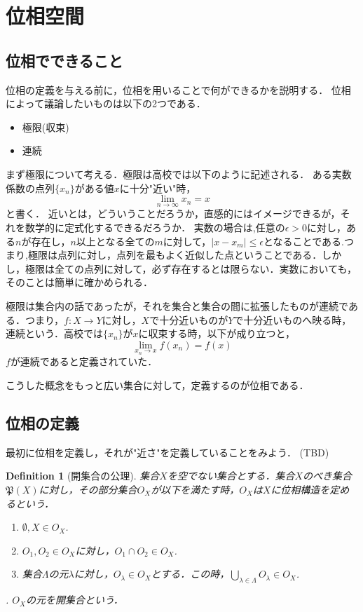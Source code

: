 \documentclass{ujarticle}
\newtheorem{dfn}[thm]{Definition}
\begin{document}
\section{位相空間}
\label{sec:位相空間}
\subsection{位相でできること}
\label{sub:位相でできること}
位相の定義を与える前に，位相を用いることで何ができるかを説明する．
位相によって議論したいものは以下の2つである．
\begin{itemize}
  \item 極限(収束)
  \item 連続
\end{itemize}

まず極限について考える．極限は高校では以下のように記述される．
ある実数係数の点列$\{ x_n \}$がある値$x$に十分"近い"時，
\begin{equation*}
 \lim_{n \to \infty} x_n=x
\end{equation*}
と書く．
近いとは，どういうことだろうか，直感的にはイメージできるが，それを数学的に定式化するできるだろうか．
実数の場合は,任意の$\epsilon \gt 0$に対し，ある$n$が存在し，$n$以上となる全ての$m$に対して，$|x - x_m| \le \epsilon$となることである.つまり,極限は点列に対し，点列を最もよく近似した点ということである．しかし，極限は全ての点列に対して，必ず存在するとは限らない．実数においても，そのことは簡単に確かめられる．

極限は集合内の話であったが，それを集合と集合の間に拡張したものが連続である．つまり，$f:X \to Y$に対し，$X$で十分近いものが$Y$で十分近いものへ映る時，連続という．高校では$\{x_n \}$が$x$に収束する時，以下が成り立つと，
\begin{equation*}
 \lim_{x_n \to x}f(x_n)=f(x)
\end{equation*}
$f$が連続であると定義されていた．

こうした概念をもっと広い集合に対して，定義するのが位相である．

\subsection{位相の定義}
\label{sub:位相の定義}
最初に位相を定義し，それが"近さ"を定義していることをみよう．
(TBD)

\begin{dfn}[開集合の公理]
 集合$X$を空でない集合とする．集合$X$のべき集合$\mathfrak{P}(X)$に対し，その部分集合$O_X$が以下を満たす時，$O_X$は$X$に位相構造を定めるという．
 \begin{enumerate}
   \item $\emptyset , X \in O_X$.
   \item $O_1,O_2 \in O_X$に対し，$O_1 \cap O_2 \in O_X$.
   \item 集合$\Lambda$の元$\lambda$に対し，$O_{\lambda} \in O_X$とする．この時，$ \bigcup_{\lambda \in \Lambda}O_{\lambda} \in O_X$.
 \end{enumerate}.
 $O_X$の元を開集合という．
\end{dfn}
\end{document}
